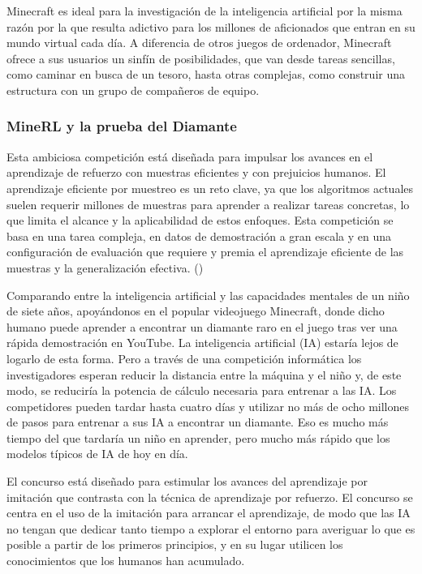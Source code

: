 Minecraft es ideal para la investigación de la inteligencia artificial por la misma razón por la que resulta adictivo para los millones de aficionados que entran en su mundo virtual cada día. A diferencia de otros juegos de ordenador, Minecraft ofrece a sus usuarios un sinfín de posibilidades, que van desde tareas sencillas, como caminar en busca de un tesoro, hasta otras complejas, como construir una estructura con un grupo de compañeros de equipo.

\subsubsection{MineRL y la prueba del Diamante}

Esta ambiciosa competición está diseñada para impulsar los avances en el aprendizaje de refuerzo con muestras eficientes y con prejuicios humanos. El aprendizaje eficiente por muestreo es un reto clave, ya que los algoritmos actuales suelen requerir millones de muestras para aprender a realizar tareas concretas, lo que limita el alcance y la aplicabilidad de estos enfoques. Esta competición se basa en una tarea compleja, en datos de demostración a gran escala y en una configuración de evaluación que requiere y premia el aprendizaje eficiente de las muestras y la generalización efectiva. (\cite{hofmann2019minecraft})

Comparando entre la inteligencia artificial y las capacidades mentales de un niño de siete años, apoyándonos en el popular videojuego Minecraft, donde dicho humano puede aprender a encontrar un diamante raro en el juego tras ver una rápida demostración en YouTube. La inteligencia artificial (IA) estaría lejos de logarlo de esta forma. Pero a través de una competición informática los investigadores esperan reducir la distancia entre la máquina y el niño y, de este modo, se reduciría la potencia de cálculo necesaria para entrenar a las IA.
Los competidores pueden tardar hasta cuatro días y utilizar no más de ocho millones de pasos para entrenar a sus IA a encontrar un diamante. Eso es mucho más tiempo del que tardaría un niño en aprender, pero mucho más rápido que los modelos típicos de IA de hoy en día.

El concurso está diseñado para estimular los avances del aprendizaje por imitación que contrasta con la técnica de aprendizaje por refuerzo. El concurso se centra en el uso de la imitación para arrancar el aprendizaje, de modo que las IA no tengan que dedicar tanto tiempo a explorar el entorno para averiguar lo que es posible a partir de los primeros principios, y en su lugar utilicen los conocimientos que los humanos han acumulado. 

